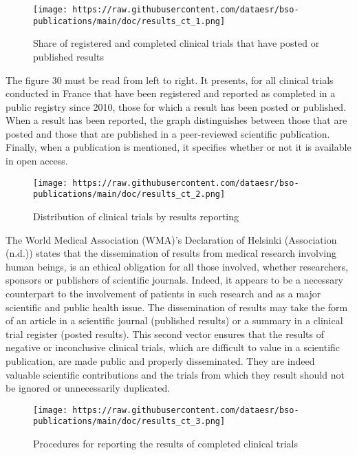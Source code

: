 \documentclass[
]{article}
\begin{document}
\begin{figure}
\centering
\texttt{[image: https://raw.githubusercontent.com/dataesr/bso-publications/main/doc/results\_ct\_1.png]}
\caption{Share of registered and completed clinical trials that have
posted or published results}
\end{figure}

The figure 30 must be read from left to right. It presents, for all
clinical trials conducted in France that have been registered and
reported as completed in a public registry since 2010, those for which a
result has been posted or published. When a result has been reported,
the graph distinguishes between those that are posted and those that are
published in a peer-reviewed scientific publication. Finally, when a
publication is mentioned, it specifies whether or not it is available in
open access.

\begin{figure}
\centering
\texttt{[image: https://raw.githubusercontent.com/dataesr/bso-publications/main/doc/results\_ct\_2.png]}
\caption{Distribution of clinical trials by results reporting}
\end{figure}

The World Medical Association (WMA)'s Declaration of Helsinki
(Association (n.d.)) states that the dissemination of results from
medical research involving human beings, is an ethical obligation for
all those involved, whether researchers, sponsors or publishers of
scientific journals. Indeed, it appears to be a necessary counterpart to
the involvement of patients in such research and as a major scientific
and public health issue. The dissemination of results may take the form
of an article in a scientific journal (published results) or a summary
in a clinical trial register (posted results). This second vector
ensures that the results of negative or inconclusive clinical trials,
which are difficult to value in a scientific publication, are made
public and properly disseminated. They are indeed valuable scientific
contributions and the trials from which they result should not be
ignored or unnecessarily duplicated.

\begin{figure}
\centering
\texttt{[image: https://raw.githubusercontent.com/dataesr/bso-publications/main/doc/results\_ct\_3.png]}
\caption{Procedures for reporting the results of completed clinical
trials}
\end{figure}
\end{document}
